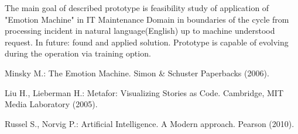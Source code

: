 \documentclass[runningheads,a4paper]{llncs}
\begin{document}
The main goal of described prototype is feasibility study of application of "Emotion Machine" \cite{minsk} in IT Maintenance Domain in boundaries of the cycle from processing incident in natural language(English) up to machine understood request. In future: found and applied solution. Prototype is capable of evolving during the operation via training option.

\begin{thebibliography}{4}

Minsky M.:
The Emotion Machine.
Simon \& Schuster Paperbacks  (2006).

Liu H., Lieberman H.:
Metafor: Visualizing Stories as Code.
Cambridge, MIT Media Laboratory  (2005).

Russel S., Norvig P.:
Artificial Intelligence. A Modern approach.
Pearson (2010).

\end{thebibliography}
\end{document}
